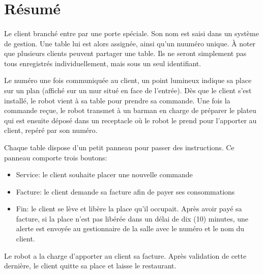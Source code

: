 \section*{Résumé}
\paragraph{}
Le client branché entre par une porte spéciale. Son 
nom est saisi dans un système de gestion. Une table 
lui est alors assignée, ainsi qu'un nuuméro unique.
À noter que plusieurs clients peuvent partager une 
table. Ils ne seront simplement pas tous enregistrés 
individuellement, mais sous un seul identifiant. \par 
Le numéro une fois communiquée au client, un point 
lumineux indique sa place sur un plan (affiché sur un 
mur situé en face de l'entrée). Dès que le client 
s'est installé, le robot vient à sa table pour prendre
sa commande. Une fois la commande reçue, le robot 
transmet à un barman en charge de préparer le plateu
qui est ensuite déposé dans un receptacle où le robot 
le prend pour l'apporter au client, repéré par son 
numéro. \par 
Chaque table dispose d'un petit panneau pour passer
des instructions. Ce panneau comporte trois boutons:
\par 
\begin{itemize}
    \item Service: le client souhaite placer une nouvelle commande
    \item Facture: le client demande sa facture afin de payer ses consommations
    \item Fin: le client se lève et libère la place qu'il occupait.
    Après avoir payé sa facture, si la place n'est pas 
    libérée dans un délai de dix (10) minutes, une alerte
    est envoyée au gestionnaire de la salle avec le 
    numéro et le nom du client.
\end{itemize}
\par
Le robot a la charge d'apporter au client sa facture. 
Après validation de cette dernière, le client quitte sa
place et laisse le restaurant.